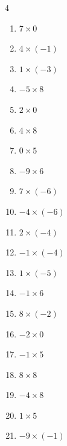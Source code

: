 \begin{multicols}{4}
\begin{enumerate}
  \item $7\times 0$
        \phantom{$=0$}

  \item $4\times (-1)$
        \phantom{$=-4$}

  \item $1\times (-3)$
        \phantom{$=-3$}

  \item $-5\times 8$
        \phantom{$=-40$}

  \item $2\times 0$
        \phantom{$=0$}

  \item $4\times 8$
        \phantom{$=32$}

  \item $0\times 5$
        \phantom{$=0$}

  \item $-9\times 6$
        \phantom{$=-54$}

  \item $7\times (-6)$
        \phantom{$=-42$}

  \item $-4\times (-6)$
        \phantom{$=24$}

  \item $2\times (-4)$
        \phantom{$=-8$}

  \item $-1\times (-4)$
        \phantom{$=4$}

  \item $1\times (-5)$
        \phantom{$=-5$}

  \item $-1\times 6$
        \phantom{$=-6$}

  \item $8\times (-2)$
        \phantom{$=-16$}

  \item $-2\times 0$
        \phantom{$=0$}

  \item $-1\times 5$
        \phantom{$=-5$}

  \item $8\times 8$
        \phantom{$=64$}

  \item $-4\times 8$
        \phantom{$=-32$}

  \item $1\times 5$
        \phantom{$=5$}

  \item $-9\times (-1)$
        \phantom{$=9$}


\end{enumerate}
\end{multicols}
